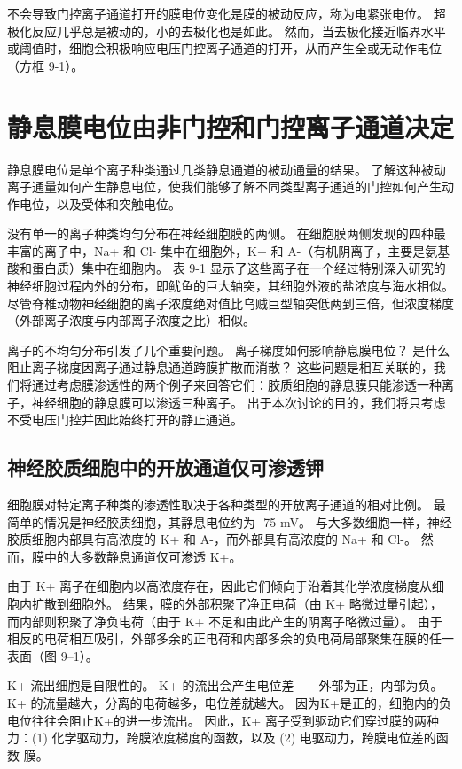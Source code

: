 不会导致门控离子通道打开的膜电位变化是膜的被动反应，称为电紧张电位。 超极化反应几乎总是被动的，小的去极化也是如此。 然而，当去极化接近临界水平或阈值时，细胞会积极响应电压门控离子通道的打开，从而产生全或无动作电位（方框 9-1）。


\section{静息膜电位由非门控和门控离子通道决定}
静息膜电位是单个离子种类通过几类静息通道的被动通量的结果。 了解这种被动离子通量如何产生静息电位，使我们能够了解不同类型离子通道的门控如何产生动作电位，以及受体和突触电位。

没有单一的离子种类均匀分布在神经细胞膜的两侧。 在细胞膜两侧发现的四种最丰富的离子中，Na+ 和 Cl- 集中在细胞外，K+ 和 A-（有机阴离子，主要是氨基酸和蛋白质）集中在细胞内。 表 9-1 显示了这些离子在一个经过特别深入研究的神经细胞过程内外的分布，即鱿鱼的巨大轴突，其细胞外液的盐浓度与海水相似。 尽管脊椎动物神经细胞的离子浓度绝对值比乌贼巨型轴突低两到三倍，但浓度梯度（外部离子浓度与内部离子浓度之比）相似。

离子的不均匀分布引发了几个重要问题。 离子梯度如何影响静息膜电位？ 是什么阻止离子梯度因离子通过静息通道跨膜扩散而消散？ 这些问题是相互关联的，我们将通过考虑膜渗透性的两个例子来回答它们：胶质细胞的静息膜只能渗透一种离子，神经细胞的静息膜可以渗透三种离子。 出于本次讨论的目的，我们将只考虑不受电压门控并因此始终打开的静止通道。





\subsection{神经胶质细胞中的开放通道仅可渗透钾}
细胞膜对特定离子种类的渗透性取决于各种类型的开放离子通道的相对比例。 最简单的情况是神经胶质细胞，其静息电位约为 -75 mV。 与大多数细胞一样，神经胶质细胞内部具有高浓度的 K+ 和 A-，而外部具有高浓度的 Na+ 和 Cl-。 然而，膜中的大多数静息通道仅可渗透 K+。

由于 K+ 离子在细胞内以高浓度存在，因此它们倾向于沿着其化学浓度梯度从细胞内扩散到细胞外。 结果，膜的外部积聚了净正电荷（由 K+ 略微过量引起），而内部则积聚了净负电荷（由于 K+ 不足和由此产生的阴离子略微过量）。 由于相反的电荷相互吸引，外部多余的正电荷和内部多余的负电荷局部聚集在膜的任一表面（图 9–1）。

K+ 流出细胞是自限性的。 K+ 的流出会产生电位差——外部为正，内部为负。 K+ 的流量越大，分离的电荷越多，电位差就越大。 因为K+是正的，细胞内的负电位往往会阻止K+的进一步流出。 因此，K+ 离子受到驱动它们穿过膜的两种力：(1) 化学驱动力，跨膜浓度梯度的函数，以及 (2) 电驱动力，跨膜电位差的函数 膜。

